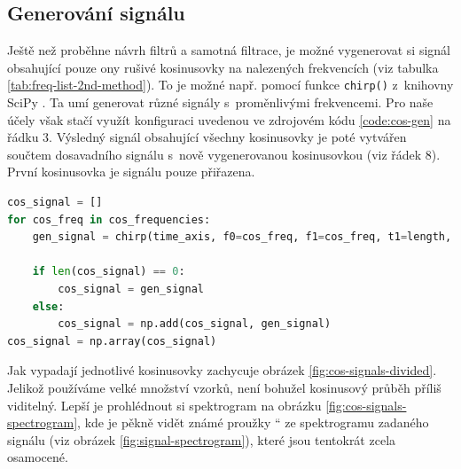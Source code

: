 \documentclass[a4paper, 11pt, final]{article}
\providecommand{\uv}[1]{\quotedblbase #1 \textquotedblleft}
\begin{document}
\subsection{Generování signálu}

Ještě než proběhne návrh filtrů a samotná filtrace, je možné vygenerovat si signál obsahující pouze ony rušivé kosinusovky na nalezených frekvencích (viz tabulka \ref{tab:freq-list-2nd-method}). To je možné např. pomocí funkce \texttt{chirp()} z~knihovny SciPy \cite{scipy-reference}. Ta umí generovat různé signály s~proměnlivými frekvencemi. Pro naše účely však stačí využít konfiguraci uvedenou ve zdrojovém kódu \ref{code:cos-gen} na řádku 3. Výsledný signál obsahující všechny kosinusovky je poté vytvářen součtem dosavadního signálu s~nově vygenerovanou kosinusovkou (viz řádek 8). První kosinusovka je signálu pouze přiřazena.

\begin{lstlisting}[language=Python, caption=Generování kosinusovek, label={code:cos-gen}]
cos_signal = []
for cos_freq in cos_frequencies:
    gen_signal = chirp(time_axis, f0=cos_freq, f1=cos_freq, t1=length, method='linear')

    if len(cos_signal) == 0:
        cos_signal = gen_signal
    else:
        cos_signal = np.add(cos_signal, gen_signal)
cos_signal = np.array(cos_signal)
\end{lstlisting}

Jak vypadají jednotlivé kosinusovky zachycuje obrázek \ref{fig:cos-signals-divided}. Jelikož používáme velké množství vzorků, není bohužel kosinusový průběh příliš viditelný. Lepší je prohlédnout si spektrogram na obrázku \ref{fig:cos-signals-spectrogram}, kde je pěkně vidět známé \uv{proužky} ze spektrogramu zadaného signálu (viz obrázek \ref{fig:signal-spectrogram}), které jsou tentokrát zcela osamocené.
\end{document}
